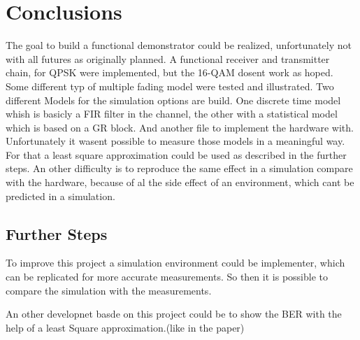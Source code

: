 
\chapter{Conclusions}

The goal to build a functional demonstrator could be realized, unfortunately not with all futures as originally planned. A functional receiver and transmitter chain, for QPSK were implemented,
but the 16-QAM dosent work as hoped.
Some different typ of multiple fading model were tested and illustrated.
Two different Models for the simulation options are build. One discrete time model whish is basicly a FIR filter in the channel, the other with a statistical model which is based on a GR block.
And another file to implement the hardware with. Unfortunately it wasent possible to measure those models in a meaningful way. For that a least square approximation could be used as described in the further steps. An other difficulty is to reproduce the same effect in a simulation compare with the hardware, because of al the side effect of an environment, which cant be predicted in a simulation.




\section{Further Steps}

To improve this project a simulation environment could be implementer, which can be replicated for more accurate measurements. So then it is possible to compare the simulation with the measurements.

An other  developnet basde on this project could be to show the BER with the help of a least Square approximation.(like in the paper)